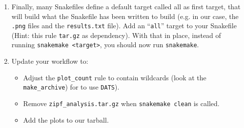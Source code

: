 \begin{frame}[fragile]
  \frametitle{} 
  \begin{enumerate}
   \item Finally, many Snakefiles define a default target called all as first target, that will build what the Snakefile has been written to build (e.g. in our case, the \texttt{.png} files and the \texttt{results.txt} file). Add an ``\texttt{all}'' target to your Snakefile (Hint: this rule \texttt{tar.gz} as dependency). With that in place, instead of running \texttt{snakemake <target>}, you should now run \texttt{snakemake}.
   \item Update your workflow to:
     \begin{itemize}
      \item Adjust the \texttt{plot\_count} rule to contain wildcards (look at the \texttt{make\_archive}) for to use \texttt{DATS}).
      \item Remove \texttt{zipf\_analysis.tar.gz} when \texttt{snakemake clean} is called.
      \item Add the plots to our tarball.
     \end{itemize}
  \end{enumerate}
\end{frame}


